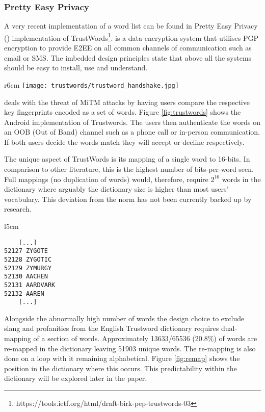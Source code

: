 \subsubsection*{Pretty Easy Privacy}
\label{sec:pep}
A very recent implementation of a word list can be found in Pretty Easy Privacy (\pep) implementation of TrustWords\footnote{https://tools.ietf.org/html/draft-birk-pep-trustwords-03}. \pep is a data encryption system that utilises PGP encryption to provide E2EE on all common channels of communication such as email or SMS. The imbedded design principles state that above all the systems should be easy to install, use and understand.

\begin{wrapfigure}{r}{6cm}
    \centering
    \texttt{[image: trustwords/trustword\_handshake.jpg]}
    \caption{Trustword fingerprint verification}
    \label{fig:trustwords}
\end{wrapfigure}

\pep deals with the threat of MiTM attacks by having users compare the respective key fingerprints encoded as a set of words. Figure \ref{fig:trustwords} shows the \pep Android implementation of Trustwords. The users then authenticate the words on an OOB (Out of Band) channel such as a phone call or in-person communication. If both users decide the words match they will accept or decline respectively.

The unique aspect of TrustWords is its mapping of a single word to 16-bits. In comparison to other literature, this is the highest number of bits-per-word seen. Full mappings (no duplication of words) would, therefore, require $2^{16}$ words in the dictionary where arguably the dictionary size is higher than most users' vocabulary. This deviation from the norm has not been currently backed up by research. 

\begin{wrapfigure}{l}{5cm}
    \centering
    \begin{BVerbatim}
    [...]
52127 ZYGOTE
52128 ZYGOTIC
52129 ZYMURGY
52130 AACHEN
52131 AARDVARK
52132 AAREN
    [...]
    \end{BVerbatim}
    \caption{Re-mapping position in Trustword dictionary}
    \label{fig:remap}
\end{wrapfigure}

Alongside the abnormally high number of words the design choice to exclude slang and profanities from the English Trustword dictionary requires dual-mapping of a section of words. Approximately 13633/65536 (20.8\%) of words are re-mapped in the dictionary leaving 51903 unique words. The re-mapping is also done on a loop with it remaining alphabetical. Figure \ref{fig:remap} shows the position in the dictionary where this occurs. This predictability within the dictionary will be explored later in the paper.

